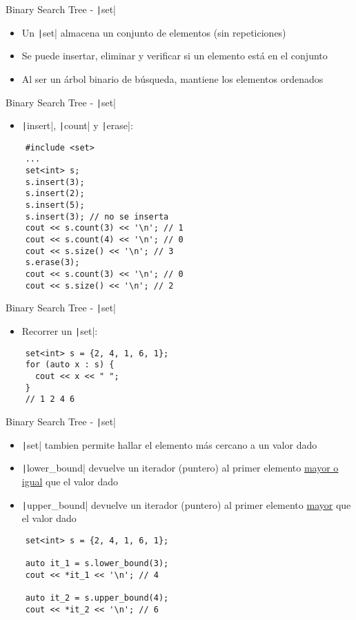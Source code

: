 \documentclass[10pt]{beamer}
\newcommand{\bi}{\begin{itemize}}
\newcommand{\ei}{\end{itemize}}
\begin{document}
\begin{frame}{Binary Search Tree - \texttt|set|}
  \bi
    \item Un \texttt|set| almacena un conjunto de elementos (sin repeticiones)
    \item Se puede insertar, eliminar y verificar si un elemento está en el conjunto
    \item Al ser un árbol binario de búsqueda, mantiene los elementos ordenados
  \ei
\end{frame}

\begin{frame}[fragile]{Binary Search Tree - \texttt|set|}
  \bi
    \item \texttt|insert|, \texttt|count| y \texttt|erase|:
  \ei
  \begin{verbatim}
    #include <set>
    ...
    set<int> s;
    s.insert(3);
    s.insert(2);
    s.insert(5);
    s.insert(3); // no se inserta
    cout << s.count(3) << '\n'; // 1
    cout << s.count(4) << '\n'; // 0
    cout << s.size() << '\n'; // 3
    s.erase(3);
    cout << s.count(3) << '\n'; // 0
    cout << s.size() << '\n'; // 2
  \end{verbatim}
\end{frame}

\begin{frame}[fragile]{Binary Search Tree - \texttt|set|}
  \bi
    \item Recorrer un \texttt|set|:
  \ei
  \begin{verbatim}
    set<int> s = {2, 4, 1, 6, 1};
    for (auto x : s) {
      cout << x << " ";
    }
    // 1 2 4 6
  \end{verbatim}
\end{frame}

\begin{frame}[fragile]{Binary Search Tree - \texttt|set|}
  \bi
    \item \texttt|set| tambien permite hallar el elemento más cercano a un valor dado
    \item \texttt|lower_bound| devuelve un iterador (puntero) al primer elemento \underline{mayor o igual} que el valor dado
    \item \texttt|upper_bound| devuelve un iterador (puntero) al primer elemento \underline{mayor} que el valor dado
  \ei
  \begin{verbatim}
    set<int> s = {2, 4, 1, 6, 1};

    auto it_1 = s.lower_bound(3);
    cout << *it_1 << '\n'; // 4

    auto it_2 = s.upper_bound(4);
    cout << *it_2 << '\n'; // 6
  \end{verbatim}
\end{frame}
\end{document}
